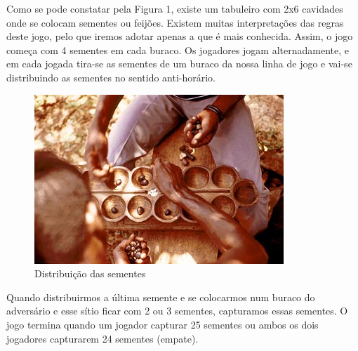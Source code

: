 \documentclass[15pt,a4paper]{article}
\begin{document}
Como se pode constatar pela Figura 1, existe um tabuleiro com 2x6 cavidades onde se colocam sementes ou feijões. Existem muitas interpretações das regras deste jogo, pelo que iremos adotar apenas a que é mais conhecida. Assim, o jogo começa com 4 sementes em cada buraco. Os jogadores jogam alternadamente, e em cada jogada tira-se as sementes de um buraco da nossa linha de jogo e vai-se distribuindo as sementes no sentido anti-horário.
\begin{figure}[H]
\begin{center}
\includegraphics[scale=0.5]{oware.jpg}
\caption{Distribuição das sementes}
\label{fig:peoplePlaying}
\end{center}
\end{figure}
 \indent Quando distribuirmos a última semente e se colocarmos num buraco do adversário e esse sítio ficar com 2 ou 3 sementes, capturamos essas sementes. O jogo termina quando um jogador capturar 25 sementes ou ambos os dois jogadores capturarem 24 sementes (empate).
\end{document}
